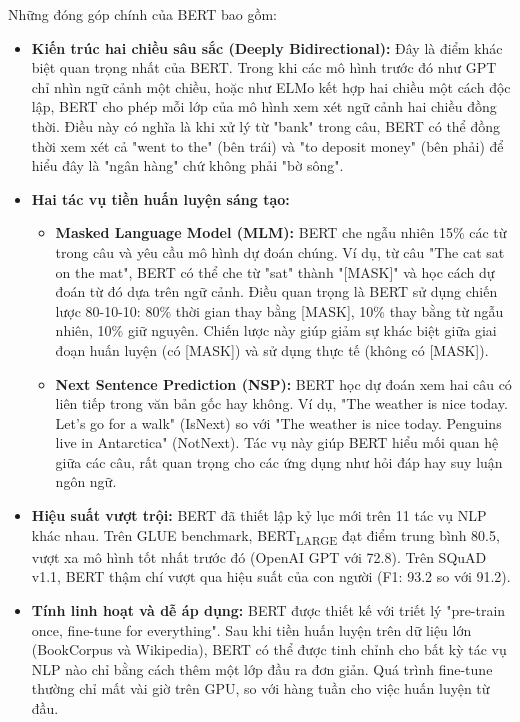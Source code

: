 Những đóng góp chính của BERT bao gồm:
\begin{itemize}
    \item \textbf{Kiến trúc hai chiều sâu sắc (Deeply Bidirectional):} Đây là điểm khác biệt quan trọng nhất của BERT. Trong khi các mô hình trước đó như GPT chỉ nhìn ngữ cảnh một chiều, hoặc như ELMo kết hợp hai chiều một cách độc lập, BERT cho phép mỗi lớp của mô hình xem xét ngữ cảnh hai chiều đồng thời. Điều này có nghĩa là khi xử lý từ "bank" trong câu, BERT có thể đồng thời xem xét cả "went to the" (bên trái) và "to deposit money" (bên phải) để hiểu đây là "ngân hàng" chứ không phải "bờ sông".
    
    \item \textbf{Hai tác vụ tiền huấn luyện sáng tạo:}
    \begin{itemize}
        \item \textbf{Masked Language Model (MLM):} BERT che ngẫu nhiên 15\% các từ trong câu và yêu cầu mô hình dự đoán chúng. Ví dụ, từ câu "The cat sat on the mat", BERT có thể che từ "sat" thành "[MASK]" và học cách dự đoán từ đó dựa trên ngữ cảnh. Điều quan trọng là BERT sử dụng chiến lược 80-10-10: 80\% thời gian thay bằng [MASK], 10\% thay bằng từ ngẫu nhiên, 10\% giữ nguyên. Chiến lược này giúp giảm sự khác biệt giữa giai đoạn huấn luyện (có [MASK]) và sử dụng thực tế (không có [MASK]).
        
        \item \textbf{Next Sentence Prediction (NSP):} BERT học dự đoán xem hai câu có liên tiếp trong văn bản gốc hay không. Ví dụ, "The weather is nice today. Let's go for a walk" (IsNext) so với "The weather is nice today. Penguins live in Antarctica" (NotNext). Tác vụ này giúp BERT hiểu mối quan hệ giữa các câu, rất quan trọng cho các ứng dụng như hỏi đáp hay suy luận ngôn ngữ.
    \end{itemize}
    
    \item \textbf{Hiệu suất vượt trội:} BERT đã thiết lập kỷ lục mới trên 11 tác vụ NLP khác nhau. Trên GLUE benchmark, BERT\textsubscript{LARGE} đạt điểm trung bình 80.5, vượt xa mô hình tốt nhất trước đó (OpenAI GPT với 72.8). Trên SQuAD v1.1, BERT thậm chí vượt qua hiệu suất của con người (F1: 93.2 so với 91.2).
    
    \item \textbf{Tính linh hoạt và dễ áp dụng:} BERT được thiết kế với triết lý "pre-train once, fine-tune for everything". Sau khi tiền huấn luyện trên dữ liệu lớn (BookCorpus và Wikipedia), BERT có thể được tinh chỉnh cho bất kỳ tác vụ NLP nào chỉ bằng cách thêm một lớp đầu ra đơn giản. Quá trình fine-tune thường chỉ mất vài giờ trên GPU, so với hàng tuần cho việc huấn luyện từ đầu.
\end{itemize}

